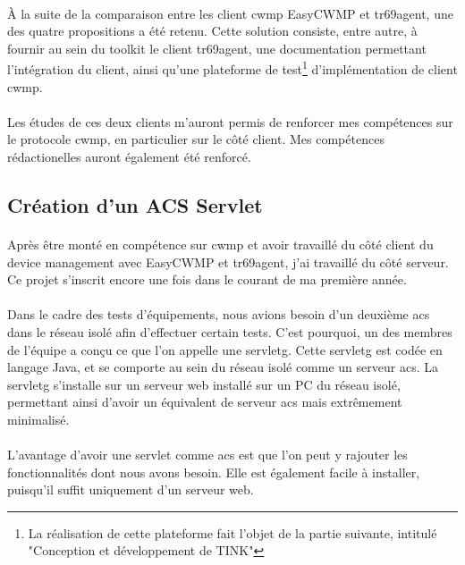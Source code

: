 \documentclass[12pt,a4paper]{report}
\begin{document}
\paragraph*{}À la suite de la comparaison entre les client \gls{cwmp} EasyCWMP et tr69agent, une des quatre propositions a été retenu. Cette solution consiste, entre autre, à fournir au sein du toolkit le client tr69agent, une documentation permettant l'intégration du client, ainsi qu'une plateforme de test\footnote{La réalisation de cette plateforme fait l'objet de la partie suivante, intitulé "Conception et développement de TINK"} d'implémentation de client \gls{cwmp}. 
\paragraph*{}Les études de ces deux clients m'auront permis de renforcer mes compétences sur le protocole \gls{cwmp}, en particulier sur le côté client. Mes compétences rédactionelles auront également été renforcé. \\
\subsection{Création d'un ACS Servlet}
\paragraph*{}Après être monté en compétence sur \gls{cwmp} et avoir travaillé du côté client du device management avec EasyCWMP et tr69agent, j’ai travaillé du côté serveur. Ce projet s'inscrit encore une fois dans le courant de ma première année.
\paragraph*{}Dans le cadre des tests d'équipements, nous avions besoin d’un deuxième \gls{acs} dans le réseau isolé afin d’effectuer certain tests. C’est pourquoi, un des membres de l’équipe a conçu ce que l’on appelle une \gls{servletg}. Cette \gls{servletg} est codée en langage Java, et se comporte au sein du réseau isolé comme un serveur \gls{acs}. La \gls{servletg} s’installe sur un serveur web installé sur un PC du réseau isolé, permettant ainsi d’avoir un équivalent de serveur \gls{acs} mais extrêmement minimalisé.
\paragraph*{}L’avantage d’avoir une servlet comme \gls{acs} est que l’on peut y rajouter les fonctionnalités dont nous avons besoin. Elle est également facile à installer, puisqu’il suffit uniquement d’un serveur web.
\end{document}
